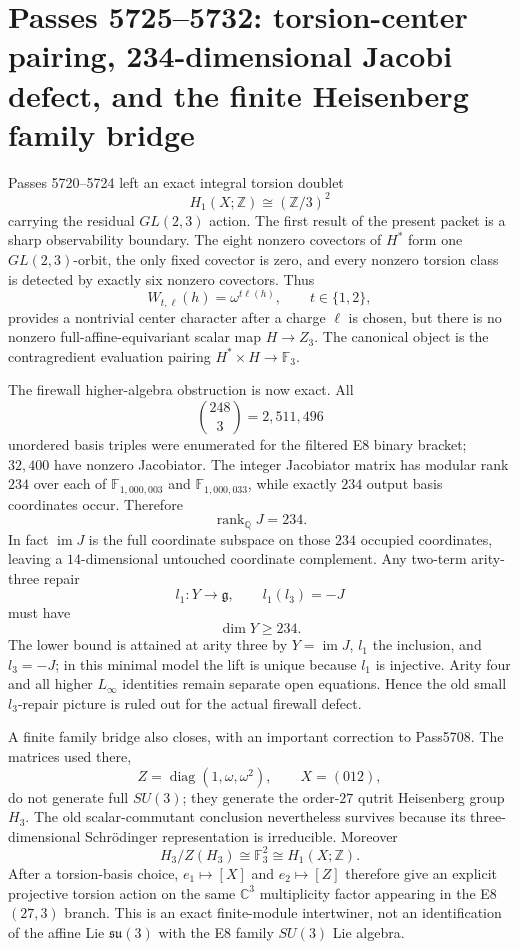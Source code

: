 \section{Passes 5725--5732: torsion-center pairing, 234-dimensional Jacobi defect, and the finite Heisenberg family bridge}
\label{sec:pass5725-5732}

Passes 5720--5724 left an exact integral torsion doublet
\[
H_1(X;\mathbb Z)\cong(\mathbb Z/3)^2
\]
carrying the residual \(GL(2,3)\) action.  The first result of the present packet is a sharp observability boundary.  The eight nonzero covectors of \(H^*\) form one \(GL(2,3)\)-orbit, the only fixed covector is zero, and every nonzero torsion class is detected by exactly six nonzero covectors.  Thus
\[
W_{t,\ell}(h)=\omega^{t\ell(h)},\qquad t\in\{1,2\},
\]
provides a nontrivial center character after a charge \(\ell\) is chosen, but there is no nonzero full-affine-equivariant scalar map \(H\to Z_3\).  The canonical object is the contragredient evaluation pairing \(H^*\times H\to\mathbb F_3\).

The firewall higher-algebra obstruction is now exact.  All
\[
\binom{248}{3}=2{,}511{,}496
\]
unordered basis triples were enumerated for the filtered E8 binary bracket; \(32{,}400\) have nonzero Jacobiator.  The integer Jacobiator matrix has modular rank \(234\) over each of \(\mathbb F_{1{,}000{,}003}\) and \(\mathbb F_{1{,}000{,}033}\), while exactly \(234\) output basis coordinates occur.  Therefore
\[
\boxed{\operatorname{rank}_{\mathbb Q}J=234}.
\]
In fact \(\operatorname{im}J\) is the full coordinate subspace on those \(234\) occupied coordinates, leaving a \(14\)-dimensional untouched coordinate complement.  Any two-term arity-three repair
\[
l_1:Y\to\mathfrak g,\qquad l_1(l_3)=-J
\]
must have
\[
\boxed{\dim Y\ge234}.
\]
The lower bound is attained at arity three by \(Y=\operatorname{im}J\), \(l_1\) the inclusion, and \(l_3=-J\); in this minimal model the lift is unique because \(l_1\) is injective.  Arity four and all higher \(L_\infty\) identities remain separate open equations.  Hence the old small \(l_3\)-repair picture is ruled out for the actual firewall defect.

A finite family bridge also closes, with an important correction to Pass5708.  The matrices used there,
\[
Z=\operatorname{diag}(1,\omega,\omega^2),\qquad X=(012),
\]
do not generate full \(SU(3)\); they generate the order-\(27\) qutrit Heisenberg group \(H_3\).  The old scalar-commutant conclusion nevertheless survives because its three-dimensional Schrödinger representation is irreducible.  Moreover
\[
\boxed{H_3/Z(H_3)\cong\mathbb F_3^2\cong H_1(X;\mathbb Z)}.
\]
After a torsion-basis choice, \(e_1\mapsto[X]\) and \(e_2\mapsto[Z]\) therefore give an explicit projective torsion action on the same \(\mathbb C^3\) multiplicity factor appearing in the E8 \((27,3)\) branch.  This is an exact finite-module intertwiner, not an identification of the affine Lie \(\mathfrak{su}(3)\) with the E8 family \(SU(3)\) Lie algebra.

